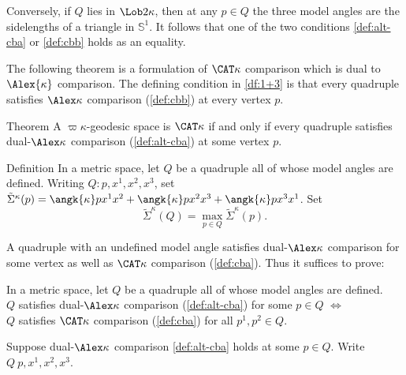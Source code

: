 Conversely, if  $Q$  lies in  $\Lob2\kappa$, then at any $p\in Q$  the three model angles are the sidelengths of a triangle in $\mathbb{S}^1$.  It follows that one of the two conditions  \ref{def:alt-cba} or \ref{def:cbb} holds as an equality.
\qeds
 
The following theorem is a formulation of $\CAT\kappa$ comparison which is dual to $\Alex{\kappa}$ comparison. 
The defining condition in  \ref{df:1+3} is that every quadruple  satisfies $\Alex\kappa$ comparison (\ref{def:cbb})  at every vertex $p$.

\begin{thm}{Theorem}\label{thm:alternate-cat-def}
A $\varpi\kappa$-geodesic space is $\CAT\kappa$ if and only if every quadruple  satisfies dual-$\Alex\kappa$ comparison (\ref{def:alt-cba}) at some vertex $p$.
\end{thm}


\begin{thm}{Definition}\label{def:Sigma-Q}
In a metric space, let $Q$ be a  quadruple all of whose model angles are defined.
Writing $Q:p,x^1,x^2,x^3$, set $\tilde \Sigma^\kappa(p)= \angk{\kappa} p{x^1}{x^2}+\angk{\kappa} p{x^2}{x^3}+\angk{\kappa}p{x^3}{x^1}$. Set 
\[\tilde \Sigma^\kappa(Q) = \max_{p\in Q}\tilde \Sigma^\kappa(p).\]
\end{thm}


%

A quadruple with an undefined model angle satisfies dual-$\Alex\kappa$ comparison for some vertex as well as $\CAT\kappa$ comparison (\ref{def:cba}). 
Thus it suffices to prove:
\begin{clm}{}\label{2+2-equiv}
In a metric space, let $Q$ be a  quadruple all of whose model angles are defined.\\
$Q$ satisfies dual-$\Alex\kappa$ comparison (\ref{def:alt-cba})
 for some $p\in Q$ 
$\Longleftrightarrow$ \ \ \ \ \\
$Q$ satisfies $\CAT\kappa$ comparison (\ref{def:cba}) for all  $p^1,p^2\in Q$. \end{clm}  

Suppose dual-$\Alex\kappa$ comparison \ref{def:alt-cba} holds at some $p\in Q$.   
Write $Q\:p,x^1,x^2,x^3$.  

